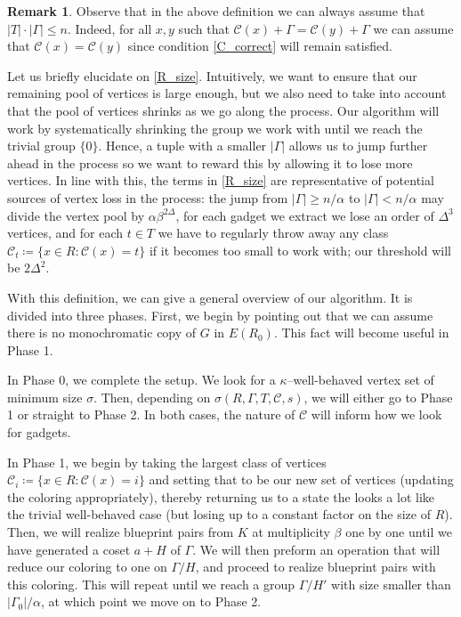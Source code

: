 \documentclass{article}
\newcommand{\cC}{\mathcal{C} }
\theoremstyle{definition}
\newtheorem{remark}[theorem]{Remark}
\begin{document}
\begin{remark}\label{T_size}
    Observe that in the above definition we can always assume that $|T|\cdot |\Gamma|\leq n$. Indeed, for all $x,y$ such that $\cC(x)+\Gamma=\cC(y)+\Gamma$ we can assume that $\cC(x)=\cC(y)$ since condition \ref{C_correct} will remain satisfied.
\end{remark}

Let us briefly elucidate on \cref{R_size}. Intuitively, we want to ensure that our remaining pool of vertices is large enough, but we also need to take into account that the pool of vertices shrinks as we go along the process. Our algorithm will work by systematically shrinking the group we work with until we reach the trivial group $\{0\}$.
Hence, a tuple with a smaller $|\Gamma|$ allows us to jump further ahead in the process so we want to reward this by allowing it to lose more vertices. In line with this, the terms in \cref{R_size} are representative of potential sources of vertex loss in the process: the jump from $|\Gamma|\ge n/\alpha$ to $|\Gamma|<n/\alpha$ may divide the vertex pool by $\alpha\beta^{2\Delta}$, for each gadget we extract we lose an order of $\Delta^3$ vertices, and for each $t\in T$ we have to regularly throw away any class $\cC_t\coloneqq \{x\in R:\cC(x)=t\}$ if it becomes too small to work with; our threshold will be $2\Delta^2$.

With this definition, we can give a general overview of our algorithm. It is divided into three phases. First, we begin by pointing out that we can assume there is no monochromatic copy of $G$ in $E(R_0)$. This fact will become useful in Phase 1. 

In Phase 0, we complete the setup. We look for a $\kappa$--well-behaved vertex set of minimum size $\sigma$. Then, depending on $\sigma(R,\Gamma,T,\cC,s)$, we will either go to Phase 1 or straight to Phase 2. In both cases, the nature of $\cC$ will inform how we look for gadgets.

In Phase 1, we begin by taking the largest class of vertices $\cC_i\coloneqq \{x\in R:\cC(x)=i\}$ and setting that to be our new set of vertices (updating the coloring appropriately), thereby returning us to a state the looks a lot like the trivial well-behaved case (but losing up to a constant factor on the size of $R$). Then, we will realize blueprint pairs from $K$ at multiplicity $\beta$ one by one until we have generated a coset $a+H$ of $\Gamma$. We will then preform an operation that will reduce our coloring to one on $\Gamma/H$, and proceed to realize blueprint pairs with this coloring. This will repeat until we reach a group $\Gamma/H'$ with size smaller than $|\Gamma_0|/\alpha$, at which point we move on to Phase 2.
\end{document}
